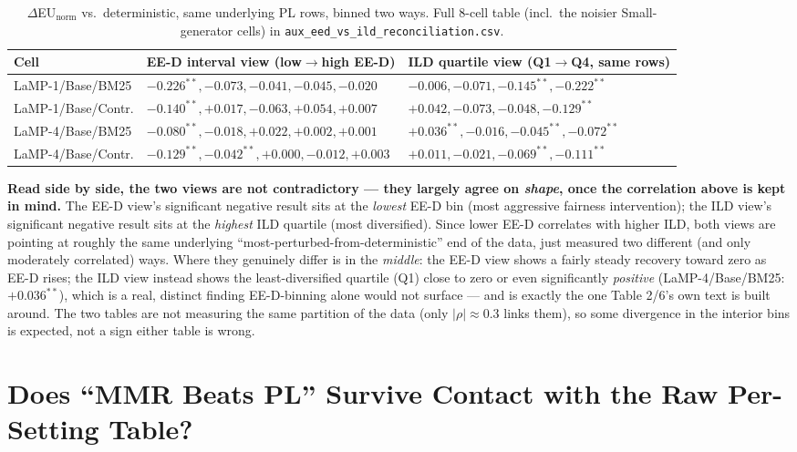 \documentclass[10pt]{article}
\begin{document}
\begin{table}[h]
\centering
\small
\begin{tabular}{@{}lll@{}}
\toprule
Cell & EE-D interval view (low$\to$high EE-D) & ILD quartile view (Q1$\to$Q4, same rows) \\
\midrule
LaMP-1/Base/BM25 &
$-0.226^{**}, -0.073, -0.041, -0.045, -0.020$ &
$-0.006, -0.071, -0.145^{**}, -0.222^{**}$ \\
LaMP-1/Base/Contr. &
$-0.140^{**}, +0.017, -0.063, +0.054, +0.007$ &
$+0.042, -0.073, -0.048, -0.129^{**}$ \\
LaMP-4/Base/BM25 &
$-0.080^{**}, -0.018, +0.022, +0.002, +0.001$ &
$+0.036^{**}, -0.016, -0.045^{**}, -0.072^{**}$ \\
LaMP-4/Base/Contr. &
$-0.129^{**}, -0.042^{**}, +0.000, -0.012, +0.003$ &
$+0.011, -0.021, -0.069^{**}, -0.111^{**}$ \\
\bottomrule
\end{tabular}
\caption{$\Delta$EU$_{\text{norm}}$ vs.\ deterministic, same underlying PL rows,
binned two ways. Full 8-cell table (incl.\ the noisier Small-generator cells) in
\texttt{aux\_eed\_vs\_ild\_reconciliation.csv}.}
\label{tab:eed-ild-sidebyside}
\end{table}

\textbf{Read side by side, the two views are not contradictory --- they largely
agree on \emph{shape}, once the correlation above is kept in mind.} The EE-D view's
significant negative result sits at the \emph{lowest} EE-D bin (most aggressive
fairness intervention); the ILD view's significant negative result sits at the
\emph{highest} ILD quartile (most diversified). Since lower EE-D correlates with
higher ILD, both views are pointing at roughly the same underlying
``most-perturbed-from-deterministic'' end of the data, just measured two different
(and only moderately correlated) ways. Where they genuinely differ is in the
\emph{middle}: the EE-D view shows a fairly steady recovery toward zero as EE-D
rises; the ILD view instead shows the least-diversified quartile (Q1) close to zero
or even significantly \emph{positive} (LaMP-4/Base/BM25: $+0.036^{**}$), which is a
real, distinct finding EE-D-binning alone would not surface --- and is exactly the
one Table 2/6's own text is built around. The two tables are not measuring the same
partition of the data (only $|\rho|\approx 0.3$ links them), so some divergence
in the interior bins is expected, not a sign either table is wrong.

\FloatBarrier
\section{Does ``MMR Beats PL'' Survive Contact with the Raw Per-Setting Table?}
\label{sec:mmr-vs-pl}
\end{document}
